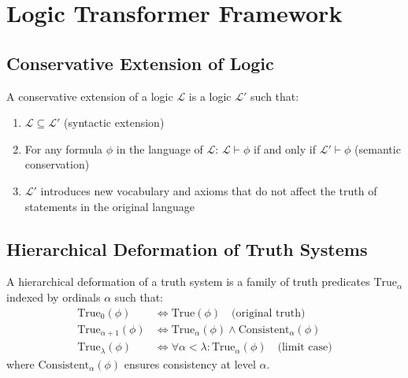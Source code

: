 
\section{Logic Transformer Framework}

\subsection{Conservative Extension of Logic}

\begin{definition}
\label{def:conservative-extension}
A conservative extension of a logic $\mathcal{L}$ is a logic $\mathcal{L}'$ such that:
\begin{enumerate}
\item $\mathcal{L} \subseteq \mathcal{L}'$ (syntactic extension)
\item For any formula $\phi$ in the language of $\mathcal{L}$: $\mathcal{L} \vdash \phi$ if and only if $\mathcal{L}' \vdash \phi$ (semantic conservation)
\item $\mathcal{L}'$ introduces new vocabulary and axioms that do not affect the truth of statements in the original language
\end{enumerate}
\end{definition}

\subsection{Hierarchical Deformation of Truth Systems}

\begin{definition}
\label{def:hierarchical-deformation}
A hierarchical deformation of a truth system is a family of truth predicates $\text{True}_\alpha$ indexed by ordinals $\alpha$ such that:
\begin{align}
\text{True}_0(\phi) &\Leftrightarrow \text{True}(\phi) \quad \text{(original truth)} \\
\text{True}_{\alpha+1}(\phi) &\Leftrightarrow \text{True}_\alpha(\phi) \land \text{Consistent}_\alpha(\phi) \\
\text{True}_\lambda(\phi) &\Leftrightarrow \forall \alpha < \lambda: \text{True}_\alpha(\phi) \quad \text{(limit case)}
\end{align}
where $\text{Consistent}_\alpha(\phi)$ ensures consistency at level $\alpha$.
\end{definition}

